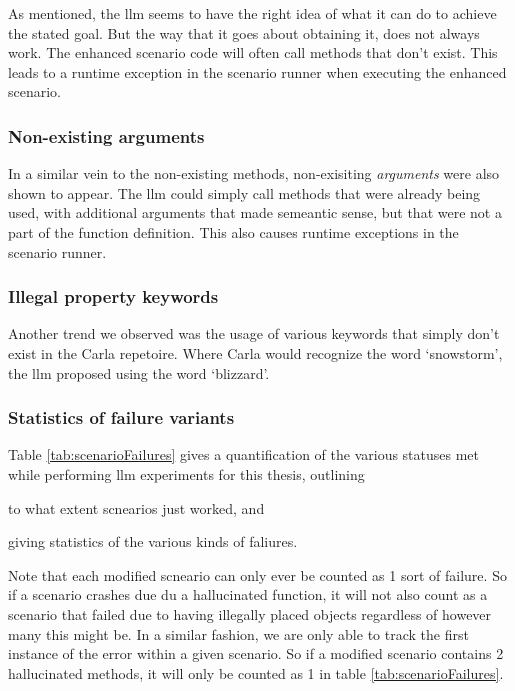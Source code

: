 As mentioned, the \acrshort{llm} seems to have the right idea of what it can do
to achieve the stated goal. But the way that it goes about obtaining it, does
not always work. The enhanced scenario code will often call methods that don't
exist. This leads to a runtime exception in the scenario runner when executing
the enhanced scenario.

\subsubsection{Non-existing arguments}

In a similar vein to the non-existing methods, non-exisiting \emph{arguments}
were also shown to appear. The \acrshort{llm} could simply call methods that
were already being used, with additional arguments that made semeantic sense,
but that were not a part of the function definition. This also causes runtime
exceptions in the scenario runner.

\subsubsection{Illegal property keywords}

Another trend we observed was the usage of various keywords that simply don't
exist in the Carla repetoire. Where Carla would recognize the word `snowstorm',
the \acrfull{llm} proposed using the word `blizzard'.


\subsubsection{Statistics of failure variants}

Table \ref{tab:scenarioFailures} gives a quantification of the various statuses met while performing
\acrshort{llm} experiments for this thesis, outlining \begin{inparaenum}
    \item to what extent scnearios just worked, and
    \item giving statistics of the various kinds of faliures.
\end{inparaenum} Note that each modified scneario can only ever be
counted as \num{1} sort of failure. So if a scenario crashes due du a hallucinated function, it
will not also count as a scenario that failed due to having illegally placed objects regardless of
however many this might be. In a similar fashion, we are only able to track the first instance of
the error within a given scenario. So if a modified scenario contains \num{2} hallucinated methods,
it will only be counted as \num{1} in table \ref{tab:scenarioFailures}.

